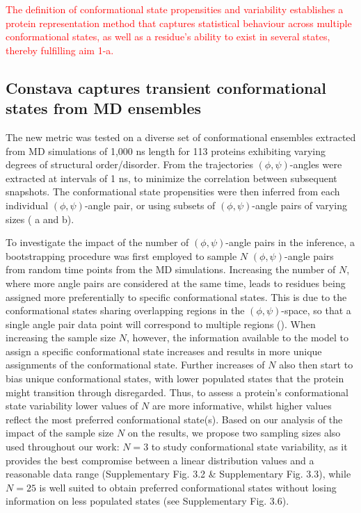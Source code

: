\textcolor{red}{The definition of conformational state propensities and variability establishes a protein representation method that captures statistical behaviour across multiple conformational states, as well as a residue's ability to exist in several states, thereby fulfilling aim 1-a.}

\subsection{Constava captures transient conformational states from MD ensembles} 
\label{section:multi_sample}

The new metric was tested on a diverse set of conformational ensembles extracted from  MD simulations of 1,000 ns length for 113 proteins exhibiting varying degrees of structural order/disorder. From the trajectories $(\phi, \psi)$-angles were extracted at intervals of 1 ns, to minimize the correlation between subsequent snapshots. The conformational state propensities were then inferred from each individual $(\phi, \psi)$-angle pair, or using subsets of $(\phi, \psi)$-angle pairs of varying sizes ( a and b).

To investigate the impact of the number of $(\phi, \psi)$-angle pairs in the inference, a bootstrapping procedure was first employed to sample $N$ $(\phi, \psi)$-angle pairs from random time points from the MD simulations. Increasing the number of $N$, where more angle pairs are considered at the same time, leads to residues being assigned more preferentially to specific conformational states. This is due to the conformational states sharing overlapping regions in the $(\phi, \psi)$-space, so that a single angle pair data point will correspond to multiple regions (). When increasing the sample size $N$, however, the information available to the model to assign a specific conformational state increases and results in more unique assignments of the conformational state. Further increases of $N$ also then start to bias unique conformational states, with lower populated states that the protein might transition through disregarded. Thus, to assess a protein's conformational state variability lower values of $N$ are more informative, whilst higher values reflect the most preferred conformational state(s). Based on our analysis of the impact of the sample size $N$ on the results, we propose two sampling sizes also used throughout our work: $N = 3$ to study conformational state variability, as it provides the best compromise between a linear distribution values and a reasonable data range (Supplementary Fig. 3.2 \& Supplementary Fig. 3.3),
while $N = 25$ is well suited to obtain preferred conformational states without losing information on less populated states (see Supplementary Fig. 3.6).

